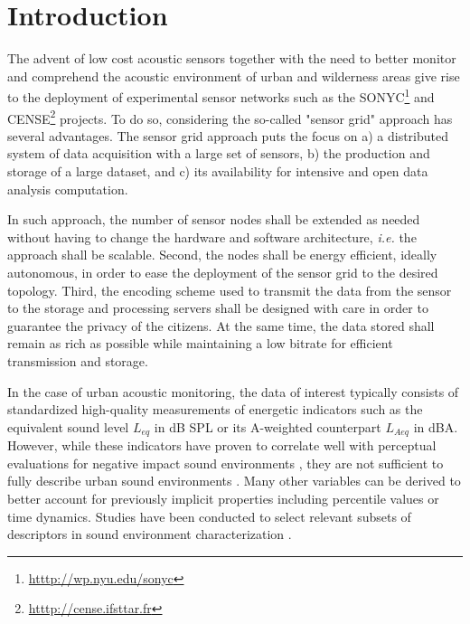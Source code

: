 \documentclass[sensors,article,submit,moreauthors,pdftex,10pt,a4paper]{mdpi}
\begin{document}


\section{Introduction}

The advent of low cost acoustic sensors together with the need to better monitor and comprehend the acoustic environment of urban and wilderness areas give rise to the deployment of experimental sensor networks such as the SONYC\footnote{\url{htttp://wp.nyu.edu/sonyc}} \cite{mydlarz2017implementation} and CENSE\footnote{\url{htttp://cense.ifsttar.fr}} \cite{picault2017} projects. To do so, considering the so-called "sensor grid" approach  \cite{lim2005sensor,tham2005sensorgrid} has several advantages. The sensor grid approach puts the focus on a) a distributed system of data acquisition with a large set of sensors, b) the production and storage of a large dataset, and c) its availability for intensive and open data analysis computation.

In such approach, the number of sensor nodes shall be extended as needed without having to change the hardware and software architecture, \textit{i.e.} the approach shall be scalable. Second, the nodes shall be energy efficient, ideally autonomous, in order to ease the deployment of the sensor grid to the desired topology. Third, the encoding scheme used to transmit the data from the sensor to the storage and processing servers shall be designed with care in order to guarantee the privacy of the citizens. At the same time, the data stored shall remain as rich as possible while maintaining a low bitrate for efficient transmission and storage.

In the case of urban acoustic monitoring, the data of interest typically consists of standardized high-quality measurements of energetic indicators such as the equivalent sound level $L_{eq}$ in dB SPL or its A-weighted counterpart $L_{Aeq}$ in dBA. However, while these indicators have proven to correlate well with perceptual evaluations for negative impact sound environments \cite{gozalo2015}, they are not sufficient to fully describe urban sound environments \cite{rychtarikova2013}. Many other variables can be derived to better account for previously implicit properties \cite{can2016} including percentile values or time dynamics. Studies have been conducted to select relevant subsets of descriptors in sound environment characterization \cite{can2015, brocolini2013, nilsson2007}.
\end{document}

